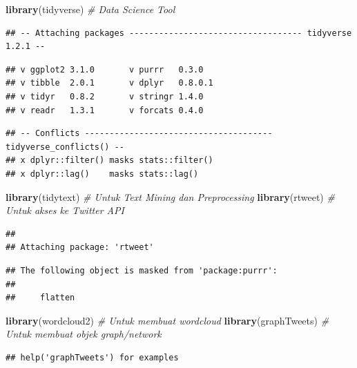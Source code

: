 \documentclass[]{tufte-handout}
\newenvironment{Shaded}{}{}
\newcommand{\KeywordTok}[1]{\textcolor[rgb]{0.00,0.44,0.13}{\textbf{#1}}}
\newcommand{\CommentTok}[1]{\textcolor[rgb]{0.38,0.63,0.69}{\textit{#1}}}
\newcommand{\NormalTok}[1]{#1}
\begin{document}
\begin{Shaded}
\begin{Highlighting}[]
\KeywordTok{library}\NormalTok{(tidyverse) }\CommentTok{# Data Science Tool}
\end{Highlighting}
\end{Shaded}

\begin{verbatim}
## -- Attaching packages ----------------------------------- tidyverse 1.2.1 --
\end{verbatim}

\begin{verbatim}
## v ggplot2 3.1.0       v purrr   0.3.0  
## v tibble  2.0.1       v dplyr   0.8.0.1
## v tidyr   0.8.2       v stringr 1.4.0  
## v readr   1.3.1       v forcats 0.4.0
\end{verbatim}

\begin{verbatim}
## -- Conflicts -------------------------------------- tidyverse_conflicts() --
## x dplyr::filter() masks stats::filter()
## x dplyr::lag()    masks stats::lag()
\end{verbatim}

\begin{Shaded}
\begin{Highlighting}[]
\KeywordTok{library}\NormalTok{(tidytext) }\CommentTok{# Untuk Text Mining dan Preprocessing}
\KeywordTok{library}\NormalTok{(rtweet) }\CommentTok{# Untuk akses ke Twitter API}
\end{Highlighting}
\end{Shaded}

\begin{verbatim}
## 
## Attaching package: 'rtweet'
\end{verbatim}

\begin{verbatim}
## The following object is masked from 'package:purrr':
## 
##     flatten
\end{verbatim}

\begin{Shaded}
\begin{Highlighting}[]
\KeywordTok{library}\NormalTok{(wordcloud2) }\CommentTok{# Untuk membuat wordcloud}
\KeywordTok{library}\NormalTok{(graphTweets) }\CommentTok{# Untuk membuat objek graph/network }
\end{Highlighting}
\end{Shaded}

\begin{verbatim}
## help('graphTweets') for examples
\end{verbatim}
\end{document}
